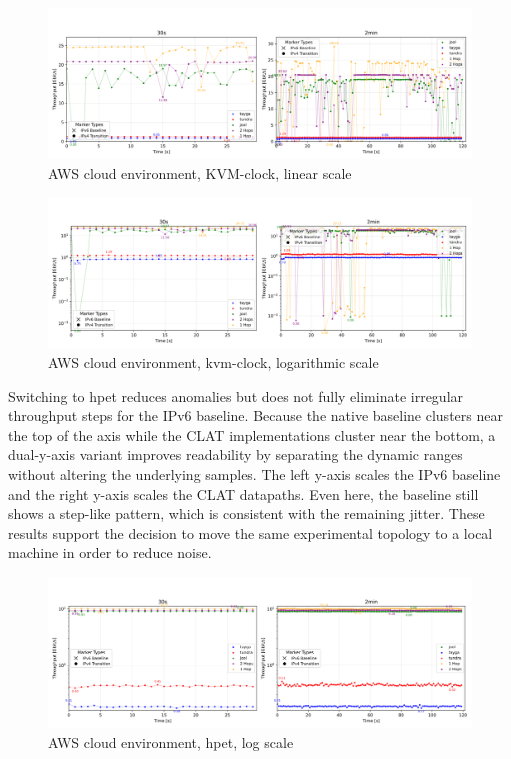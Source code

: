 \begin{figure}[H]
    \centering
    \includegraphics[width=1\textwidth]{resources/plots/CombinedPlot/TCP/AWS_tcp_sameScale_kvm-clock_linear.png}
    \caption{AWS cloud environment, KVM-clock, linear scale}
    \label{fig:AWS_tcp_sameScale_kvm-clock_linear}

\end{figure}
\begin{figure}[H]
    \centering
    \includegraphics[width=1\textwidth]{resources/plots/CombinedPlot/TCP/AWS_tcp_sameScale_kvm-clock_log.png}
    \caption{AWS cloud environment, kvm-clock, logarithmic scale}
    \label{fig:AWS_tcp_sameScale_kvm-clock_log}

\end{figure}

Switching to hpet reduces anomalies but does not fully eliminate irregular throughput steps for the IPv6 baseline. Because the native baseline clusters near the top of the axis while the CLAT implementations cluster near the bottom, a dual-y-axis variant improves readability by separating the dynamic ranges without altering the underlying samples. The left y-axis scales the IPv6 baseline and the right y-axis scales the CLAT datapaths. Even here, the baseline still shows a step-like pattern, which is consistent with the remaining jitter. These results support the decision to move the same experimental topology to a local machine in order to reduce noise. 


\begin{figure}[H]
    \centering
    \includegraphics[width=1\textwidth]{resources/plots/CombinedPlot/TCP/AWS_tcp_sameScale_hpet_log.png}
    \caption{AWS cloud environment, hpet, log scale}
    \label{fig:AWS_tcp_sameScale_hpet_log}

\end{figure}


